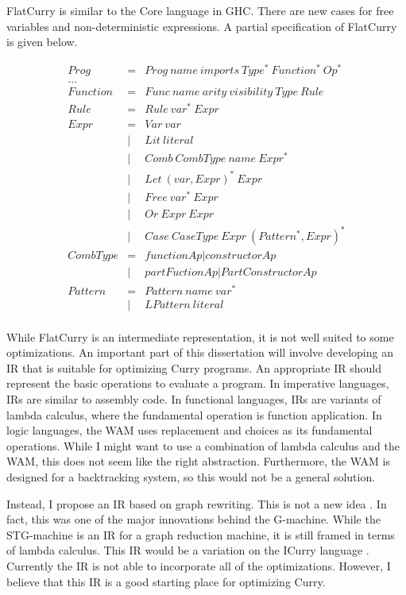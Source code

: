 FlatCurry is similar to the Core language in GHC.
There are new cases for free variables and non-deterministic expressions.
A partial specification of FlatCurry is given below.


$$\begin{array}{lll}
Prog     & = & Prog\ name\ imports\ Type^*\ Function^*\ Op^* \\
\ldots   &   & \\
Function & = & Func\ name\ arity\ visibility\ Type\ Rule \\
Rule     & = & Rule\ var^*\ Expr \\
Expr     & = & Var\ var \\
         & | & Lit\ literal \\
         & | & Comb\ CombType\ name\ Expr^* \\
         & | & Let\ (var, Expr)^*\ Expr\\
         & | & Free\ var^*\ Expr\\
         & | & Or\ Expr\ Expr \\
         & | & Case\ CaseType\ Expr\ (Pattern^*, Expr)^* \\
CombType & = & functionAp | constructorAp  \\
         & | & partFuctionAp | PartConstructorAp \\
Pattern  & = & Pattern\ name\ var^* \\
         & | & LPattern\ literal \\

\end{array}
$$

While FlatCurry is an intermediate representation, it is not well suited to some optimizations.
An important part of this dissertation will involve developing an IR that is suitable
for optimizing Curry programs.
An appropriate IR should represent the basic operations to evaluate a program.
In imperative languages, IRs are similar to assembly code.
In functional languages, IRs are variants of lambda calculus,
where the fundamental operation is function application.
In logic languages, the WAM uses replacement and choices as its fundamental operations.
While I might want to use a combination of lambda calculus and the WAM, this does not seem like the right abstraction.
Furthermore, the WAM is designed for a backtracking system, so this would not be a general solution.

Instead, I propose an IR based on graph rewriting.
This is not a new idea \cite{graph_ir, dactl, functional_PeytonJones}.
In fact, this was one of the major innovations behind the G-machine.
While the STG-machine is an IR for a graph reduction machine, it is still framed in terms
of lambda calculus.
This IR would be a variation on the ICurry language \cite{AntoyJost16LOPSTR}.
Currently the IR is not able to incorporate all of the optimizations.
However, I believe that this IR is a good starting place for optimizing Curry.

